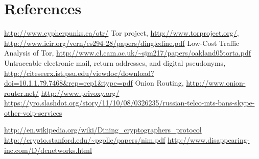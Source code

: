 \section{References}
\begin{thebibliography}{666}
 \url{http://www.cypherpunks.ca/otr/}
 Tor project, \url{http://www.torproject.org/},
\url{http://www.icir.org/vern/cs294-28/papers/dingledine.pdf}
 Low-Cost Traffic Analysis of Tor,
    \url{http://www.cl.cam.ac.uk/~sjm217/papers/oakland05torta.pdf}
 Untraceable electronic mail, return addresses, and digital pseudonyms,
\url{http://citeseerx.ist.psu.edu/viewdoc/download?doi=10.1.1.79.7468&rep=rep1&type=pdf}
 Onion Routing, \url{http://www.onion-router.net/}
 \url{http://www.privoxy.org/}
\url{https://yro.slashdot.org/story/11/10/08/0326235/russian-telco-mts-bans-skype-other-voip-services}

\url{http://en.wikipedia.org/wiki/Dining_cryptographers_protocol}
\url{http://crypto.stanford.edu/~pgolle/papers/nim.pdf}
\url{http://www.disappearing-inc.com/D/dcnetworks.html}

\end{thebibliography}
